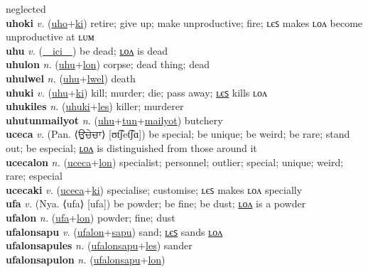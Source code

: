 neglected \label{uholum} \\
\textbf{uhoki} \textit{v.} (\hyperref[uho]{uho}+\hyperref[ki]{ki})
retire; give up; make unproductive; fire; ʟєꜱ makes ʟᴏᴧ become unproductive at ʟᴜᴍ \label{uhoki} \\
\textbf{uhu} \textit{v.} (\hyperref[ici]{~~ici~~})
be dead; \hyperref[uhulon]{ʟᴏᴧ} is dead \label{uhu} \\
\textbf{uhulon} \textit{n.} (\hyperref[uhu]{uhu}+\hyperref[lon]{lon})
corpse; dead thing; dead \label{uhulon} \\
\textbf{uhulwel} \textit{n.} (\hyperref[uhu]{uhu}+\hyperref[lwel]{lwel})
death \label{uhulwel} \\
\textbf{uhuki} \textit{v.} (\hyperref[uhu]{uhu}+\hyperref[ki]{ki})
kill; murder; die; pass away; \hyperref[uhukiles]{ʟєꜱ} kills ʟᴏᴧ \label{uhuki} \\
\textbf{uhukiles} \textit{n.} (\hyperref[uhuki]{uhuki}+\hyperref[les]{les})
killer; murderer \label{uhukiles} \\
\textbf{uhutunmailyot} \textit{n.} (\hyperref[uhu]{uhu}+\hyperref[tun]{tun}+\hyperref[mailyot]{mailyot})
butchery \label{uhutunmailyot} \\
\textbf{uceca} \textit{v.} (Pan. ⟨ਉਚੇਚਾ⟩ [ʊt͡ʃet͡ʃɑ])
be special; be unique; be weird; be rare; stand out; be especial; \hyperref[ucecalon]{ʟᴏᴧ} is distinguished from those around it \label{uceca} \\
\textbf{ucecalon} \textit{n.} (\hyperref[uceca]{uceca}+\hyperref[lon]{lon})
specialist; personnel; outlier; special; unique; weird; rare; especial \label{ucecalon} \\
\textbf{ucecaki} \textit{v.} (\hyperref[uceca]{uceca}+\hyperref[ki]{ki})
specialise; customise; ʟєꜱ makes ʟᴏᴧ specially \label{ucecaki} \\
\textbf{ufa} \textit{v.} (Nya. ⟨ufa⟩ [ufa])
be powder; be fine; be dust; \hyperref[ufalon]{ʟᴏᴧ} is a powder \label{ufa} \\
\textbf{ufalon} \textit{n.} (\hyperref[ufa]{ufa}+\hyperref[lon]{lon})
powder; fine; dust \label{ufalon} \\
\textbf{ufalonsapu} \textit{v.} (\hyperref[ufalon]{ufalon}+\hyperref[sapu]{sapu})
sand; \hyperref[ufalonsapules]{ʟєꜱ} sands \hyperref[ufalonsapulon]{ʟᴏᴧ} \label{ufalonsapu} \\
\textbf{ufalonsapules} \textit{n.} (\hyperref[ufalonsapu]{ufalonsapu}+\hyperref[les]{les})
sander \label{ufalonsapules} \\
\textbf{ufalonsapulon} \textit{n.} (\hyperref[ufalonsapu]{ufalonsapu}+\hyperref[lon]{lon})
